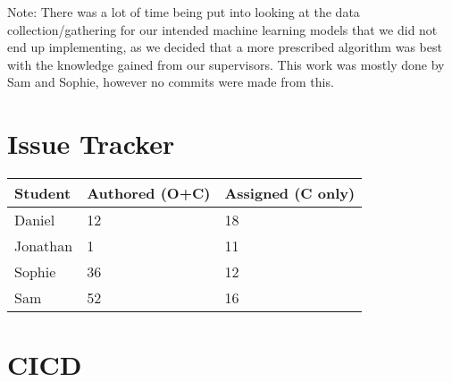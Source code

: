 \documentclass{article}
\begin{document}
Note: There was a lot of time being put into looking at the data collection/gathering for our intended machine learning models that we did not end up implementing, as we decided that a more prescribed algorithm was best with the knowledge gained from our supervisors. This work was mostly done by Sam and Sophie, however no commits were made from this. 


\section{Issue Tracker}

\begin{table}[H]
\centering
\begin{tabular}{lll}
\toprule
\textbf{Student} & \textbf{Authored (O+C)} & \textbf{Assigned (C only)}\\
\midrule
Daniel & 12 & 18 \\
Jonathan & 1 & 11 \\
Sophie & 36 & 12 \\
Sam & 52 & 16 \\
\bottomrule
\end{tabular}
\end{table}


\section{CICD}

\end{document}
